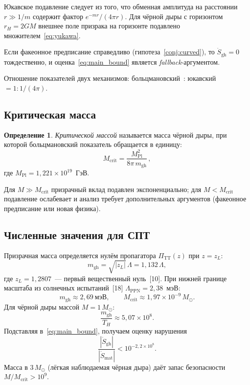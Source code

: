 \documentclass[12pt,a4paper]{article}
\newcommand{\PiTT}{\Pi_{\mathrm{TT}}}
\newcommand{\Lam}{\Lambda}
\newcommand{\MPl}{M_{\mathrm{Pl}}}
\newcommand{\Msun}{M_{\odot}}
\newcommand{\Mcrit}{M_{\mathrm{crit}}}
\newcommand{\mghost}{m_{\mathrm{gh}}}
\newcommand{\Thr}{T_{\!H}}
\theoremstyle{plain}
\theoremstyle{definition}
\newtheorem{definition}[theorem]{Определение}
\begin{document}
Юкавское подавление следует из того, что обменная амплитуда
на расстоянии $r \gg 1/m$ содержит фактор $e^{-mr}/(4\pi r)$.
Для чёрной дыры с горизонтом $r_H = 2GM$ внешнее поле призрака
на горизонте подавлено множителем~\eqref{eq:yukawa}.

Если факеонное предписание справедливо
(гипотеза~\ref{conj:curved}), то $\dot S_{\mathrm{gh}} = 0$
тождественно, и оценка~\eqref{eq:main_bound} является
\emph{fallback}-аргументом.

Отношение показателей двух механизмов:
больцмановский~: юкавский $= 1 : 1/(4\pi)$.

\subsection{Критическая масса}

\begin{definition}\label{def:Mcrit}
\emph{Критической массой} называется масса чёрной дыры, при которой
больцмановский показатель обращается в единицу:
\begin{equation}\label{eq:Mcrit}
  \Mcrit = \frac{\MPl^2}{8\pi\,\mghost}\,,
\end{equation}
где $\MPl = 1{,}221 \times 10^{19}$~ГэВ.
\end{definition}

Для $M \gg \Mcrit$ призрачный вклад подавлен экспоненциально;
для $M < \Mcrit$ подавление ослабевает и анализ требует
дополнительных аргументов (факеонное предписание или новая физика).

\subsection{Численные значения для СПТ}

Призрачная масса определяется нулём пропагатора $\PiTT(z)$
при $z = z_L$:
\begin{equation}\label{eq:mghost}
  \mghost = \sqrt{|z_L|}\,\Lam = 1{,}132\,\Lam,
\end{equation}
где $z_L = 1{,}2807$~--- первый вещественный нуль~[10]. При нижней
границе масштаба из солнечных испытаний~[18]
$\Lam_{\mathrm{PPN}} = 2{,}38$~мэВ:
\begin{equation}\label{eq:mghost_num}
  \mghost \approx 2{,}69~\text{мэВ}, \qquad
  \Mcrit \approx 1{,}97 \times 10^{-9}\,\Msun.
\end{equation}
Для чёрной дыры массой $M = 1\,\Msun$:
\begin{equation}\label{eq:m_over_T}
  \frac{\mghost}{\Thr} \approx 5{,}07 \times 10^8.
\end{equation}
Подставляя в~\eqref{eq:main_bound}, получаем оценку нарушения
\begin{equation}\label{eq:bound_1Msun}
  \frac{|\dot S_{\mathrm{gh}}|}{|\dot S_{\mathrm{mat}}|}
  < 10^{-2{,}2 \times 10^8}.
\end{equation}
Масса в $3\,\Msun$ (лёгкая наблюдаемая чёрная дыра) даёт
запас безопасности $M/\Mcrit > 10^9$.
\end{document}
